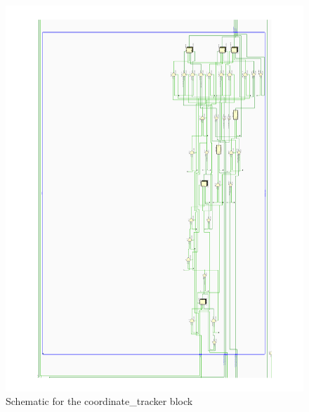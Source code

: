     \begin{figure}[H]
        \centering
        \includegraphics[width=\textwidth]{annexes/coordinate_tracker.pdf}
        \caption{Schematic for the coordinate\_tracker block}
        \label{anx:coordinate_tracker}
    \end{figure}
    \pagebreak
